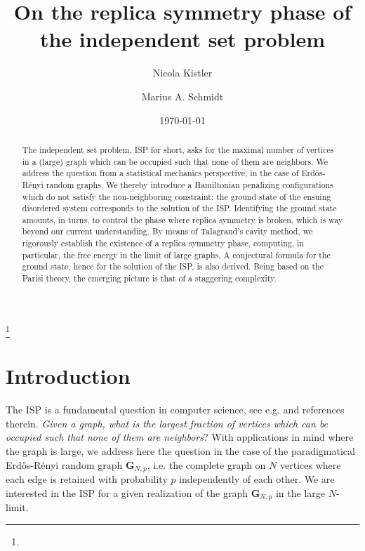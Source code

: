 \documentclass[a4paper,12pt,oneside,reqno]{amsart}
\numberwithin{equation}{section}
\begin{document}
\title[Replica symmetry of ISP]
{On the replica symmetry phase of \\ the independent set problem}

\author[N. Kistler]{Nicola Kistler}
\address{J.W. Goethe-Universit\"at Frankfurt, Germany.}

\author[M. Schmidt]{Marius A. Schmidt}

 

\thanks{ } 

 \date{\today}

\begin{abstract} 
The independent set problem, ISP for short, asks for the maximal number of vertices in a (large) graph which can be occupied such that none of them are neighbors. We address the question from a statistical mechanics perspective, in the case of Erd\H{o}s-R\'{e}nyi random graphs. We thereby introduce a Hamiltonian penalizing configurations which do not satisfy the non-neighboring constraint:  the ground state of the ensuing disordered system corresponds to the solution of the ISP. Identifying the ground state amounts, in turns, to control the phase where replica symmetry is broken, which is way beyond our current understanding. By means of Talagrand's cavity method, we rigorously establish the existence of a replica symmetry phase, computing, in particular, the free energy in the limit of large graphs. A conjectural  formula for the ground state, hence for the solution of the ISP, is also derived. Being based on the Parisi theory, the emerging picture is that of a staggering complexity. 
\end{abstract}

\maketitle

\tableofcontents

\section{Introduction}

The ISP is a fundamental question in computer science, see e.g. \cite{aco_eft, bandy_bamarnik,  dani_moore,     frieze, frieze_mcdiarmid, gamarnik_et_al} and references therein. {\it Given a graph, what is the largest fraction of vertices which can be occupied such that none of them are neighbors}? With applications in mind where the graph is large, we address here the question in the case of the paradigmatical Erd\H{o}s-R\'{e}nyi random graph $\mathbf G_{N, p}$, i.e. the complete graph on $N$ vertices where each edge is retained with probability $p$ independently of each other. We are interested in the ISP for a given realization of the graph $\mathbf G_{N, p}$ in the large $N$-limit. 
\end{document}
